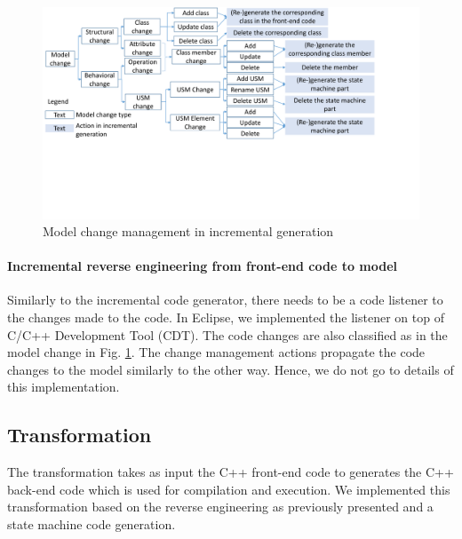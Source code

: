 
\begin{figure}
	\centering
	\includegraphics[clip, trim=0.2cm 7.2cm 4.0cm 0.0cm, width=1\columnwidth]{figures/modelchange.pdf}
	\caption{Model change management in incremental generation} 
	\label{fig:modelchange}
\end{figure}

\noindent
\paragraph{Incremental reverse engineering from front-end code to model}
Similarly to the incremental code generator, there needs to be a code listener to the changes made to the code.
In Eclipse, we implemented the listener on top of C/C++ Development Tool (CDT).
The code changes are also classified as in the model change in Fig. \ref{fig:modelchange}.
The change management actions propagate the code changes to the model similarly to the other way.
Hence, we do not go to details of this implementation. 




\subsection{Transformation}
The transformation takes as input the C++ front-end code to generates the C++ back-end code which is used for compilation and execution.
We implemented this transformation based on the reverse engineering as previously presented and a state machine code generation. 

